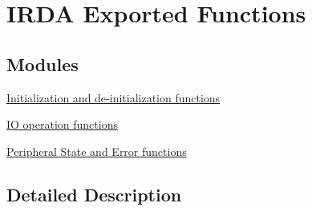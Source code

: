 \hypertarget{group___i_r_d_a___exported___functions}{}\section{I\+R\+DA Exported Functions}
\label{group___i_r_d_a___exported___functions}
\subsection*{Modules}
\begin{DoxyCompactItemize}
\item 
\hyperlink{group___i_r_d_a___exported___functions___group1}{Initialization and de-\/initialization functions}
\item 
\hyperlink{group___i_r_d_a___exported___functions___group2}{I\+O operation functions}
\item 
\hyperlink{group___i_r_d_a___exported___functions___group3}{Peripheral State and Error functions}
\end{DoxyCompactItemize}


\subsection{Detailed Description}
